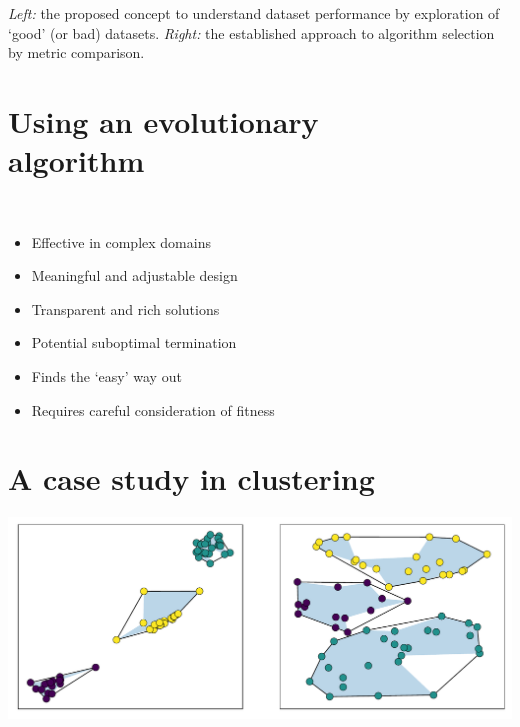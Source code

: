 \documentclass{betterposter}
\begin{document}
{\textcolor{mygrey}{%
    \textit{Left:} the proposed concept to understand dataset performance by
    exploration of `good' (or bad) datasets. \textit{Right:} the established
    approach to algorithm selection by metric comparison.
}

\vspace{-.5em}\section{Using an evolutionary\\algorithm}

\vspace{-1em}\begin{minipage}{.04\linewidth}
    \
\end{minipage}
\begin{minipage}{.9\linewidth}
    \begin{itemize}
        \renewcommand\labelitemi{\faThumbsOUp~}
        \item Effective in complex domains
        \item Meaningful and adjustable design
        \item Transparent and rich solutions
    \end{itemize}

    \vspace{1ex}\begin{itemize}
        \renewcommand\labelitemi{\faThumbsODown~}
        \item Potential suboptimal termination
        \item Finds the `easy' way out
        \item Requires careful consideration of fitness
    \end{itemize}
\end{minipage}


\section{A case study in clustering}

\vspace{-1.5em}\begin{center}
    \begin{minipage}{.8\linewidth}
        \includegraphics[width=\linewidth]{img/kmeans.pdf}\vspace{1ex}


\end{minipage}
\end{center}}
\end{document}
